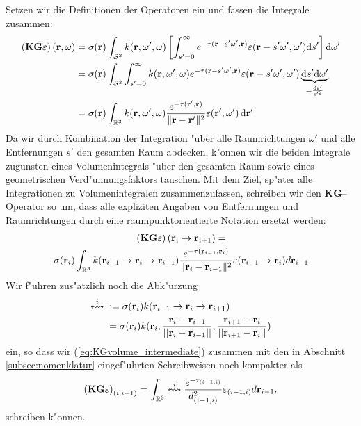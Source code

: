 	Setzen wir die Definitionen der Operatoren ein und fassen die Integrale zusammen:
	\begin{align*}
		\left(\mathbf{KG}\varepsilon\right)(\mathbf{r},\omega)&=\sigma(\mathbf{r}) \int_{\mathcal{S}^2} k(\mathbf{r},\omega',\omega)\left[\int_{s'=0}^\infty e^{-\tau(\mathbf{r}-s' \omega',\mathbf{r})}\varepsilon(\mathbf{r}-s' \omega',\omega') \text{d}s'\right] \text{d}\omega' \\
		&=\sigma(\mathbf{r}) \int_{\mathcal{S}^2} \int_{s'=0}^\infty k(\mathbf{r},\omega',\omega) e^{-\tau(\mathbf{r}-s' \omega',\mathbf{r})}\varepsilon(\mathbf{r}-s' \omega',\omega') \underbrace{\text{d}s' \text{d}\omega'}_{=\frac{\text{d}\mathbf{r}'}{s'^2}} \\
		&=\sigma(\mathbf{r}) \int_{\mathbb{R}^3} k(\mathbf{r},\omega',\omega) \frac{e^{-\tau(\mathbf{r}',\mathbf{r})}}{\|\mathbf{r}-\mathbf{r}'\|^2}\varepsilon(\mathbf{r}',\omega') \,\text{d}\mathbf{r}'
	\end{align*}
	Da wir durch Kombination der Integration "uber alle Raumrichtungen $\omega'$ und alle Entfernungen $s'$ den gesamten Raum abdecken, k"onnen wir die beiden Integrale zugunsten eines Volumenintegrals "uber den gesamten Raum sowie eines geometrischen Verd"unnungsfaktors tauschen. Mit dem Ziel, sp"ater alle Integrationen zu Volumenintegralen zusammenzufassen, schreiben wir den $\mathbf{KG}$--Operator so um, dass alle expliziten Angaben von Entfernungen und Raumrichtungen durch eine raumpunktorientierte Notation ersetzt werden:
	\begin{multline}
		\left(\mathbf{KG}\varepsilon\right)(\mathbf{r}_i \rightarrow\mathbf{r}_{i+1})=\\
		\sigma(\mathbf{r}_i) \int_{\mathbb{R}^3} k(\mathbf{r}_{i-1}\rightarrow\mathbf{r}_i\rightarrow\mathbf{r}_{i+1})\frac{e^{-\tau(\mathbf{r}_{i-1},\mathbf{r}_i)}}{\|\mathbf{r}_i-\mathbf{r}_{i-1}\|^2}\varepsilon(\mathbf{r}_{i-1} \rightarrow\mathbf{r}_i)d\mathbf{r}_{i-1}
		\label{eq:KGvolume_intermediate}
	\end{multline}
	Wir f"uhren zus"atzlich noch die Abk"urzung
	\begin{align*}
		\overset{i}{\leftrightsquigarrow}\;&:=\sigma(\mathbf{r}_i)k(\mathbf{r}_{i-1}\rightarrow\mathbf{r}_i\rightarrow\mathbf{r}_{i+1})\\
			&=\sigma(\mathbf{r}_i)k(\mathbf{r}_i,\frac{\mathbf{r}_i-\mathbf{r}_{i-1}}{||\mathbf{r}_i-\mathbf{r}_{i-1}||},\frac{\mathbf{r}_{i+1}-\mathbf{r}_i}{||\mathbf{r}_{i+1}-\mathbf{r}_i||})
	\end{align*}
	ein, so dass wir (\ref{eq:KGvolume_intermediate}) zusammen mit den in Abschnitt \ref{subsec:nomenklatur} eingef"uhrten Schreibweisen noch kompakter als
	\begin{equation}
		\left(\mathbf{KG}\varepsilon\right)_{(i,i+1)}=\int_{\mathbb{R}^3} \overset{i}{\leftrightsquigarrow}\frac{e^{-\tau_{(i-1,i)}}}{d_{(i-1,i)}^2}\varepsilon_{(i-1,i)}d\mathbf{r}_{i-1}.
		\label{eq:KGvolume}
	\end{equation}
	schreiben k"onnen.



